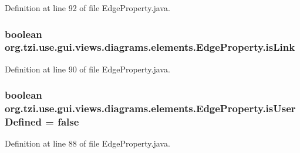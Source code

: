 Definition at line 92 of file Edge\-Property.\-java.

\hypertarget{classorg_1_1tzi_1_1use_1_1gui_1_1views_1_1diagrams_1_1elements_1_1_edge_property_a6e91f4d4f439e3c373d762f81f3d4ad4}{
\subsubsection[{is\-Link}]{\setlength{\rightskip}{0pt plus 5cm}boolean org.\-tzi.\-use.\-gui.\-views.\-diagrams.\-elements.\-Edge\-Property.\-is\-Link\hspace{0.3cm}{\ttfamily [protected]}}}\label{classorg_1_1tzi_1_1use_1_1gui_1_1views_1_1diagrams_1_1elements_1_1_edge_property_a6e91f4d4f439e3c373d762f81f3d4ad4}


Definition at line 90 of file Edge\-Property.\-java.

\hypertarget{classorg_1_1tzi_1_1use_1_1gui_1_1views_1_1diagrams_1_1elements_1_1_edge_property_a9f3248038ba59a4b661677f8b443dc10}{
\subsubsection[{is\-User\-Defined}]{\setlength{\rightskip}{0pt plus 5cm}boolean org.\-tzi.\-use.\-gui.\-views.\-diagrams.\-elements.\-Edge\-Property.\-is\-User\-Defined = false\hspace{0.3cm}{\ttfamily [protected]}}}\label{classorg_1_1tzi_1_1use_1_1gui_1_1views_1_1diagrams_1_1elements_1_1_edge_property_a9f3248038ba59a4b661677f8b443dc10}


Definition at line 88 of file Edge\-Property.\-java.

